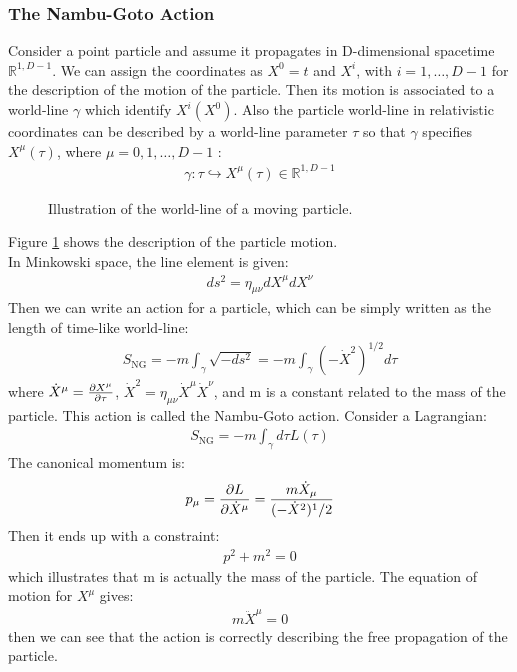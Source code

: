 \subsubsection{The Nambu-Goto Action}
Consider a point particle and assume it propagates in D-dimensional spacetime $\mathbb{R}^{1,D-1}$. We can assign the coordinates as $X^{0} = t$ and $X^{i}$, with $i = 1, \dotso , D-1$ for the description of the motion of the particle. Then its motion is associated to a world-line $\gamma$ which identify $X^{i} (X^{0})$. Also the particle world-line in relativistic coordinates can be described by a world-line parameter $\tau$ so that $\gamma$ specifies $X^{\mu}(\tau)$, where $\mu = 0,1,\dotso , D-1$ :
\begin{align}
    \gamma : \tau \hookrightarrow X^{\mu} (\tau) \in \mathbb{R} ^{1,D-1}
\end{align}
\begin{figure}
    \centering
    \caption{Illustration of the world-line of a moving particle.}
    \label{fig:worldline}
\end{figure}
Figure \ref{fig:worldline} shows the description of the particle motion. \\
\indent In Minkowski space, the line element is given:
\begin{align}
    ds^{2} = \eta_{\mu \nu} dX^{\mu} dX^{\nu} 
\end{align}
Then we can write an action for a particle, which can be simply written as the length of time-like world-line:
\begin{align}
    S_{\text{NG}} = -m\int _{\gamma} \sqrt{-ds^{2}} = -m\int _{\gamma} (-\dot{X}^{2})^{1/2} d\tau
\end{align}
where $\dot{X} ^{\mu} = \pdv{X^{\mu}}{\tau}$, $\dot{X} ^{2} = \eta _{\mu \nu} \dot{X}^{\mu} \dot{X} ^{\nu}$, and m is a constant related to the mass of the particle. This action is called the Nambu-Goto action. Consider a Lagrangian:
\begin{align}
    S_{\text{NG}} = -m\int_{\gamma} d\tau L(\tau)
\end{align}
The canonical momentum is:
\begin{align}
    p_{\mu} = \pdv{L}{\dot{X}^{\mu}} = \frac{m\dot{X}_{\mu}}{(-\dot{X}^{2})^1/2}
\end{align}
Then it ends up with a constraint:
\begin{align}
    p^{2} + m^{2} = 0
\end{align}
which illustrates that m is actually the mass of the particle. The equation of motion for $X^{\mu}$ gives:
\begin{align}
    m\ddot{X}^{\mu} =0
\end{align}
then we can see that the action is correctly describing the free propagation of the particle.
